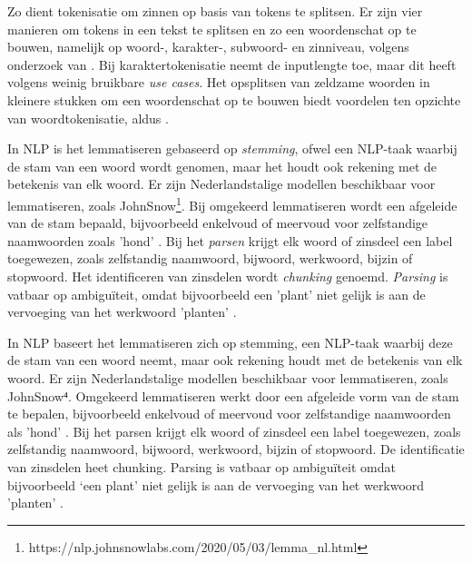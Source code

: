 \medspace

Zo dient tokenisatie om zinnen op basis van tokens te splitsen. Er zijn vier manieren om tokens in een tekst te splitsen en zo een woordenschat op te bouwen, namelijk op woord-, karakter-, subwoord- en zinniveau, volgens onderzoek van \textcite{Menzli2023}. Bij karaktertokenisatie neemt de inputlengte toe, maar dit heeft volgens \textcite{Ribeiro2018} weinig bruikbare \textit{use cases}. Het opsplitsen van zeldzame woorden in kleinere stukken om een woordenschat op te bouwen biedt voordelen ten opzichte van woordtokenisatie, aldus \autocite{Iredale2022}.

\medspace

In NLP is het lemmatiseren gebaseerd op \textit{stemming}, ofwel een NLP-taak waarbij de stam van een woord wordt genomen, maar het houdt ook rekening met de betekenis van elk woord. Er zijn Nederlandstalige modellen beschikbaar voor lemmatiseren, zoals JohnSnow\footnote{https://nlp.johnsnowlabs.com/2020/05/03/lemma\_nl.html}. Bij omgekeerd lemmatiseren wordt een afgeleide van de stam bepaald, bijvoorbeeld enkelvoud of meervoud voor zelfstandige naamwoorden zoals 'hond' \autocite{Eisenstein2019}. Bij het \textit{parsen} krijgt elk woord of zinsdeel een label toegewezen, zoals zelfstandig naamwoord, bijwoord, werkwoord, bijzin of stopwoord. Het identificeren van zinsdelen wordt \textit{chunking} genoemd. \textit{Parsing} is vatbaar op ambiguïteit, omdat bijvoorbeeld een 'plant' niet gelijk is aan de vervoeging van het werkwoord 'planten' \autocite{Eisenstein2019}.

In NLP baseert het lemmatiseren zich op stemming, een NLP-taak waarbij deze de stam van een woord neemt, maar ook rekening houdt met de betekenis van elk woord. Er zijn Nederlandstalige modellen beschikbaar voor lemmatiseren, zoals JohnSnow⁴. Omgekeerd lemmatiseren werkt door een afgeleide vorm van de stam te bepalen, bijvoorbeeld enkelvoud of meervoud voor zelfstandige naamwoorden als ’hond’ \autocite{Eisenstein2019}. Bij het parsen krijgt elk woord of zinsdeel een label toegewezen, zoals zelfstandig naamwoord, bijwoord, werkwoord, bijzin of stopwoord. De identificatie van zinsdelen heet chunking. Parsing is vatbaar op ambiguïteit omdat bijvoorbeeld ‘een plant’ niet gelijk is aan de vervoeging van het werkwoord ’planten’ \autocite{Eisenstein2019}.

\medspace

